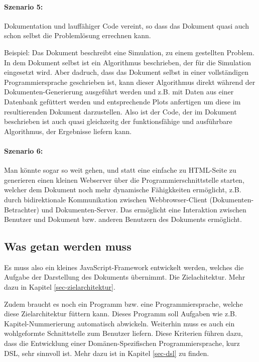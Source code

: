 \paragraph{Szenario 5:} Dokumentation
und lauffähiger Code vereint, so dass das Dokument quasi auch schon selbst
die Problemlösung errechnen kann.

Beispiel: Das Dokument beschreibt eine Simulation, zu einem gestellten
Problem. In dem Dokument selbst ist ein Algorithmus beschrieben, der
für die Simulation eingesetzt wird. Aber dadruch, dass das Dokument selbst
in einer vollständigen Programmiersprache geschrieben ist, kann dieser
Algorithmus direkt während der Dokumenten-Generierung ausgeführt werden
und z.B. mit Daten aus einer Datenbank gefüttert werden und entsprechende Plots
anfertigen um diese im resultierenden Dokument darzustellen.
Also ist der Code, der im Dokument beschrieben ist auch quasi gleichzeitg
der funktionsfähige und ausführbare Algorithmus, der Ergebnisse liefern kann.

\paragraph{Szenario 6:} Man könnte sogar so weit gehen, und statt eine einfache
zu HTML-Seite zu generieren einen kleinen Webserver über die
Programmierschnittstelle starten, welcher dem Dokument noch
mehr dynamische Fähigkkeiten ermöglicht, z.B. durch bidirektionale
Kommunikation zwischen Webbrowser-Client (Dokumenten-Betrachter) und
Dokumenten-Server. Das ermöglicht eine Interaktion zwischen Benutzer und
Dokument bzw. anderen Benutzern des Dokuments ermöglicht.

\subsection{Was getan werden muss}

Es muss also ein kleines JavaScript-Framework entwickelt werden, welches die
Aufgabe der Darstellung des Dokuments übernimmt. Die Zielachitektur.
Mehr dazu in Kapitel \ref{sec-zielarchitektur}.

Zudem braucht es noch ein Programm bzw. eine Programmiersprache, welche diese
Zielarchitektur füttern kann. Dieses Programm soll Aufgaben wie z.B.
Kapitel-Nummerierung automatisch abwickeln. Weiterhin muss es auch ein
wohlgeformte Schnittstelle zum Benutzer liefern. Diese Kriterien führen
dazu, dass die Entwicklung einer Domänen-Spezifischen Programmiersprache,
kurz DSL, sehr sinnvoll ist. Mehr dazu ist in Kapitel \ref{sec-dsl} zu finden.


